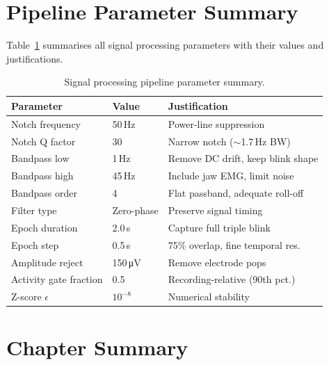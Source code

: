 \section{Pipeline Parameter Summary}
\label{sec:sp_params}

Table~\ref{tab:pipeline_params} summarises all signal
processing parameters with their values and justifications.

\begin{table}[htbp]
\centering
\caption{Signal processing pipeline parameter summary.}
\label{tab:pipeline_params}
\renewcommand{\arraystretch}{1.3}
\begin{tabular}{p{3.0cm} p{2.0cm} p{4.5cm}}
\toprule
\textbf{Parameter} & \textbf{Value} & \textbf{Justification} \\
\midrule
Notch frequency    & 50\,Hz     & Power-line suppression \\
Notch Q factor     & 30         & Narrow notch ($\sim$1.7\,Hz BW) \\
Bandpass low       & 1\,Hz      & Remove DC drift, keep blink shape \\
Bandpass high      & 45\,Hz     & Include jaw EMG, limit noise \\
Bandpass order     & 4          & Flat passband, adequate roll-off \\
Filter type        & Zero-phase & Preserve signal timing \\
Epoch duration     & 2.0\,s     & Capture full triple blink \\
Epoch step         & 0.5\,s     & 75\% overlap, fine temporal res. \\
Amplitude reject   & 150\,\si{\micro\volt} & Remove electrode pops \\
Activity gate fraction & 0.5        & Recording-relative (90th pct.) \\
Z-score $\epsilon$ & $10^{-8}$  & Numerical stability \\
\bottomrule
\end{tabular}
\end{table}

\section{Chapter Summary}
\label{sec:sp_summary}

